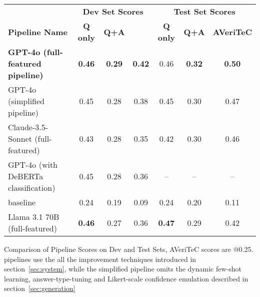     \centering
    \begin{tabular}{l | c c c | c c c}
    \hline
    &\multicolumn{3}{c|}{\textbf{Dev Set Scores}} & \multicolumn{3}{c}{\textbf{Test Set Scores}}  \\
    \textbf{Pipeline Name} & \textbf{Q only} & \textbf{Q+A} & \textbf{\averitec{}} & \textbf{Q only} & \textbf{Q+A} & \textbf{AVeriTeC} \\ \hline
    \textbf{GPT-4o (full-featured pipeline)}      & \textbf{0.46} & \textbf{0.29} & \textbf{0.42} & 0.46 & \textbf{0.32} & \textbf{0.50}\\
    GPT-4o (simplified pipeline)         & 0.45 & 0.28 & 0.38 & 0.45 & 0.30 & 0.47 \\
    Claude-3.5-Sonnet (full-featured)             & 0.43 & 0.28 & 0.35 & 0.42 & 0.30 & 0.46 \\
    GPT-4o (with DeBERTa classification)              & 0.45 & 0.28 & 0.36 & -- & -- & --\\
    \averitec{} baseline            & 0.24 & 0.19 & 0.09 & 0.24 & 0.20 & 0.11\\
    \hline
    Llama 3.1 70B (full-featured) & \textbf{0.46} & 0.27 & 0.36 & \textbf{0.47} & 0.29 & 0.42\\
    \bottomrule
    \end{tabular}
    \caption{Comparison of Pipeline Scores on Dev and Test Sets, AVeriTeC scores are @0.25.  pipelines use the all the improvement techniques introduced in section~\ref{sec:system}, while the simplified pipeline omits the dynamic few-shot learning, answer-type-tuning and Likert-scale confidence emulation described in section~\ref{sec:generation}}
    \label{tab:pipeline_scores}